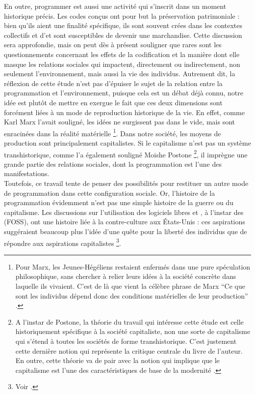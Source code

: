     En outre, programmer est aussi une activité qui s'inscrit dans un moment historique précis. Les codes conçus ont pour but la préservation patrimoniale : bien qu'ils aient une finalité spécifique, ils sont souvent crées dans les contextes collectifs et d'\opso et sont susceptibles de devenir une marchandise. Cette discussion sera approfondie, mais on peut dès à présent souligner que rares sont les questionnements concernant les effets de la codification et la manière dont elle masque les relations sociales qui impactent, directement ou indirectement, non seulement l’environnement, mais aussi la vie des individus. Autrement dit, la réflexion de cette étude n'est pas d'épuiser le sujet de la relation entre la programmation et l'environnement, puisque cela est un débat déjà connu, notre idée est plutôt de mettre en exergue le fait que ces deux dimensions sont forcément liées à un mode de reproduction historique de la vie. En effet, comme Karl Marx l’avait souligné, les idées ne surgissent pas dans le vide, mais sont enracinées dans la réalité matérielle \footnote{Pour Marx, les Jeunes-Hégéliens restaient enfermés dans une pure spéculation philosophique, sans chercher à relier leurs idées à la société concrète dans laquelle ils vivaient. C'est de là que vient la célèbre phrase de Marx \enquote{Ce que sont les individus dépend donc des conditions matérielles de leur production} \cite[p.~44-45]{marx1968}.}. Dans notre société, les moyens de production sont principalement capitalistes. Si le capitalisme n'est pas un système transhistorique, comme l'a également souligné Moishe Postone \footnote{A l'instar de Postone, la théorie du travail qui intéresse cette étude est celle historiquement spécifique à la société capitaliste, non une sorte de capitalisme qui s'étend à toutes les sociétés de forme transhistorique. C'est justement cette dernière notion qui représente la critique centrale du livre de l'auteur. En outre, cette théorie va de pair avec la notion qui implique que le capitalisme est l'une des caractéristiques de base de la modernité \cite[p.~9-21]{postone1996}.}, il imprègne une grande partie des relations sociales, dont la programmation est l'une des manifestations.\\
    
    Toutefois, ce travail tente de penser des possibilités pour restituer un autre mode de programmation dans cette configuration sociale. Or, l’histoire de la programmation évidemment n'est pas une simple histoire de la guerre ou du capitalisme. Les discussions sur l’utilisation des logiciels libres et \opso, à l'instar des  (FOSS), ont une histoire liée à la contre-culture aux États-Unis : ces aspirations suggéraient beaucoup plus l’idée d’une quête pour la liberté des individus que de répondre aux aspirations capitalistes \footnote{Voir \cite{shi2014mainstreaming}.}.\\

